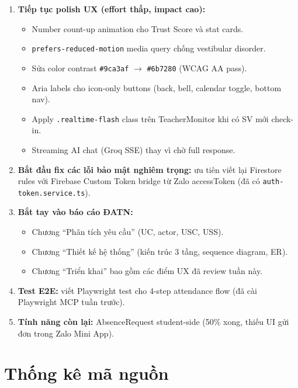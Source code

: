 \documentclass{article}
\begin{document}
\begin{enumerate}[leftmargin=1.5em]
  \item \textbf{Tiếp tục polish UX (effort thấp, impact cao):}
  \begin{itemize}[leftmargin=1em]
    \item Number count-up animation cho Trust Score và stat cards.
    \item \texttt{prefers-reduced-motion} media query chống vestibular disorder.
    \item Sửa color contrast \texttt{\#9ca3af} $\to$ \texttt{\#6b7280} (WCAG AA pass).
    \item Aria labels cho icon-only buttons (back, bell, calendar toggle, bottom nav).
    \item Apply \texttt{.realtime-flash} class trên TeacherMonitor khi có SV mới check-in.
    \item Streaming AI chat (Groq SSE) thay vì chờ full response.
  \end{itemize}
  \item \textbf{Bắt đầu fix các lỗi bảo mật nghiêm trọng:} ưu tiên viết lại Firestore rules với Firebase Custom Token bridge từ Zalo accessToken (đã có \texttt{auth-token.service.ts}).
  \item \textbf{Bắt tay vào báo cáo ĐATN:}
  \begin{itemize}[leftmargin=1em]
    \item Chương ``Phân tích yêu cầu'' (UC, actor, USC, USS).
    \item Chương ``Thiết kế hệ thống'' (kiến trúc 3 tầng, sequence diagram, ER).
    \item Chương ``Triển khai'' bao gồm các điểm UX đã review tuần này.
  \end{itemize}
  \item \textbf{Test E2E:} viết Playwright test cho 4-step attendance flow (đã cài Playwright MCP tuần trước).
  \item \textbf{Tính năng còn lại:} AbsenceRequest student-side (50\% xong, thiếu UI gửi đơn trong Zalo Mini App).
\end{enumerate}

\section{Thống kê mã nguồn}
\end{document}
